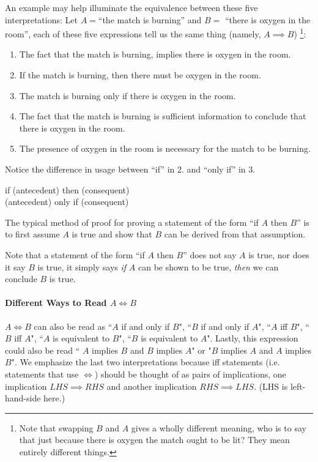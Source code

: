 An example may help illuminate the equivalence between these five interpretations: Let $A=$``the match is burning'' and $B=$ ``there is oxygen in the room'', each of these five expressions tell us the same thing (namely, $A \implies B$) \footnote{Note that swapping $B$ and $A$ gives a wholly different meaning, who is to say that just because there is oxygen the match ought to be lit? They mean entirely different things.}:
\begin{enumerate}
    \item The fact that the match is burning, implies there is oxygen in the room.
    \item If the match is burning, then there must be oxygen in the room.
    \item The match is burning only if there is oxygen in the room.
    \item The fact that the match is burning is sufficient information to conclude that there is oxygen in the room.
    \item The presence of oxygen in the room is necessary for the match to be burning.
\end{enumerate}
Notice the difference in usage between ``if'' in 2. and ``only if'' in 3.
\begin{center}
    if (antecedent) then (consequent)  \\
(antecedent) only if (consequent) \\
\end{center}

\noindent The typical method of proof for proving a statement of the form ``if $A$ then $B$'' is to first assume $A$ is true and show that $B$ can be derived from that assumption.

\noindent Note that a statement of the form ``if $A$ then $B$'' does not say $A$ is true, nor does it say $B$ is true, it simply says \textit{if} $A$ can be shown to be true, \textit{then} we can conclude $B$ is true.

\paragraph{Different Ways to Read $A \iff B$}
$A\iff B$ can also be read as ``$A$ if and only if $B$", ``$B$ if and only if $A$", ``$A$ iff $B$", ``$B$ iff $A$", ``$A$ is equivalent to $B$", ``$B$ is equivalent to $A$". Lastly, this expression could also be read `` $A$ implies $B$ and $B$ implies $A$" or "$B$ implies $A$ and $A$ implies $B$". We emphasize the last two interpretations because iff statements (i.e. statements that use $\iff$) should be thought of as pairs of implications, one implication $LHS\implies RHS$ and another implication $RHS \implies LHS$. (LHS is left-hand-side here.)\\

